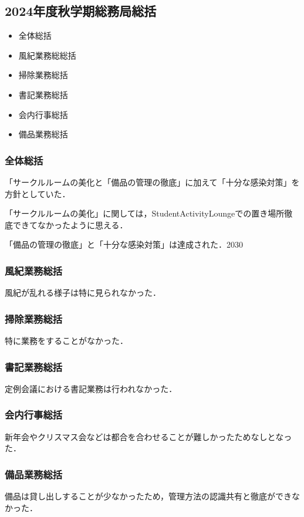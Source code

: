 \subsection*{2024年度秋学期総務局総括}


\begin{itemize}
    \item 全体総括
    \item 風紀業務総総括
    \item 掃除業務総括
    \item 書記業務総括
    \item 会内行事総括
    \item 備品業務総括
\end{itemize}

\subsubsection*{全体総括}

「サークルルームの美化と「備品の管理の徹底」に加えて「十分な感染対策」を方針としていた．

「サークルルームの美化」に関しては，StudentActivityLoungeでの置き場所徹底できてなかったように思える．

「備品の管理の徹底」と「十分な感染対策」は達成された．2030

\subsubsection*{風紀業務総括}

風紀が乱れる様子は特に見られなかった．

\subsubsection*{掃除業務総括}

特に業務をすることがなかった．

\subsubsection*{書記業務総括}

定例会議における書記業務は行われなかった．

\subsubsection*{会内行事総括}

新年会やクリスマス会などは都合を合わせることが難しかったためなしとなった．

\subsubsection*{備品業務総括}
備品は貸し出しすることが少なかったため，管理方法の認識共有と徹底ができなかった．

